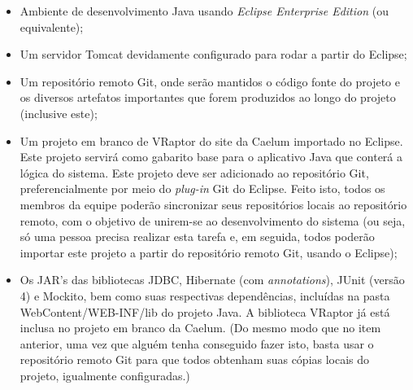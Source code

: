 \documentclass[11pt, a4paper]{article}
\begin{document}
        \begin{itemize}
            \item Ambiente de desenvolvimento Java usando \emph{Eclipse Enterprise
            Edition} (ou equivalente);
            
            \item Um servidor Tomcat devidamente configurado para rodar a partir do Eclipse;
            
            \item Um repositório remoto Git, onde serão mantidos o código fonte do
            projeto e os diversos artefatos importantes que forem produzidos ao
            longo do projeto (inclusive este);
            
            \item Um projeto em branco de VRaptor do site da Caelum importado no
            Eclipse. Este projeto servirá como gabarito base para o aplicativo Java que conterá a lógica do sistema. Este projeto deve ser adicionado ao
            repositório Git, preferencialmente por meio do \textit{plug-in} Git do
            Eclipse.
            Feito isto, todos os membros da equipe poderão sincronizar seus repositórios locais ao 
            repositório remoto, com o objetivo de unirem-se ao desenvolvimento do sistema (ou seja, só
            uma pessoa precisa realizar esta tarefa e, em seguida, todos poderão importar este
            projeto a partir do repositório remoto Git, usando o Eclipse);
            
            \item Os JAR's das bibliotecas JDBC, Hibernate (com \emph{annotations}),
            JUnit (versão 4) e Mockito, bem como suas respectivas dependências,
            incluídas na pasta WebContent/WEB-INF/lib do projeto Java.
            A biblioteca VRaptor já está inclusa no projeto em branco da Caelum.
            (Do mesmo modo que no item anterior, uma vez que alguém tenha
            conseguido fazer isto, basta usar o repositório remoto Git para que todos obtenham suas cópias locais do projeto,  igualmente configuradas.)
        \end{itemize}
\end{document}
